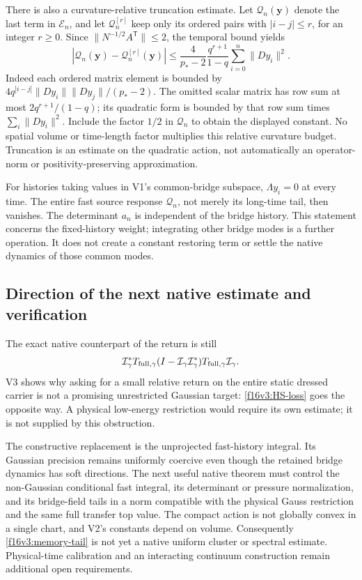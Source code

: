 \documentclass[11pt,oneside]{article}
\begin{document}
There is also a curvature-relative truncation estimate.
Let \(\mathcal Q_n(\mathbf y)\) denote the last term in
\(\mathcal E_n\), and let \(\mathcal Q_n^{[r]}\) keep only
its ordered pairs with \(|i-j|\le r\), for an integer \(r\ge0\).
Since \(\|N^{-1/2}A^{\mathsf T}\|\le2\), the temporal bound yields
\begin{equation}
 |\mathcal Q_n(\mathbf y)-\mathcal Q_n^{[r]}(\mathbf y)|
 \le \frac{4}{p_*-2}\frac{q^{r+1}}{1-q}
                               \sum_{i=0}^n\|Dy_i\|^2 .
 \label{f16v3:memory-tail}
\end{equation}
Indeed each ordered matrix element is bounded by
\(4q^{|i-j|}\|Dy_i\|\|Dy_j\|/(p_*-2)\).
The omitted scalar matrix has row sum at most
\(2q^{r+1}/(1-q)\); its quadratic form is bounded by that
row sum times \(\sum_i\|Dy_i\|^2\). Include the factor
\(1/2\) in \(\mathcal Q_n\) to obtain the displayed constant.
No spatial volume or time-length factor multiplies this
relative curvature budget. Truncation is an estimate on the
quadratic action, not automatically an operator-norm or
positivity-preserving approximation.

For histories taking values in V1's common-bridge subspace,
\(\Lambda y_i=0\) at every time. The entire fast source
response \(\mathcal Q_n\), not merely its long-time tail,
then vanishes. The determinant \(a_n\) is independent of
the bridge history. This statement concerns the fixed-history
weight; integrating other bridge modes is a further operation.
It does not create a constant restoring term or settle the
native dynamics of those common modes.

\subsection{Direction of the next native estimate and verification}

The exact native counterpart of the return is still
\[
 \mathcal I_\gamma^*T_{\rm full,\gamma}
        (I-\mathcal I_\gamma\mathcal I_\gamma^*)
                         T_{\rm full,\gamma}\mathcal I_\gamma.
\]
V3 shows why asking for a small relative return on the entire
static dressed carrier is not a promising unrestricted
Gaussian target: \eqref{f16v3:HS-loss} goes the opposite way.
A physical low-energy restriction would require its own
estimate; it is not supplied by this obstruction.

The constructive replacement is the unprojected fast-history
integral. Its Gaussian precision remains uniformly coercive
even though the retained bridge dynamics has soft directions.
The next useful native theorem must control the non-Gaussian
conditional fast integral, its determinant or pressure
normalization, and its bridge-field tails in a norm compatible
with the physical Gauss restriction and the same full transfer
top value. The compact action is not globally convex in a
single chart, and V2's constants depend on volume. Consequently
\eqref{f16v3:memory-tail} is not yet a native uniform cluster or
spectral estimate. Physical-time calibration and an interacting
continuum construction remain additional open requirements.
\end{document}
